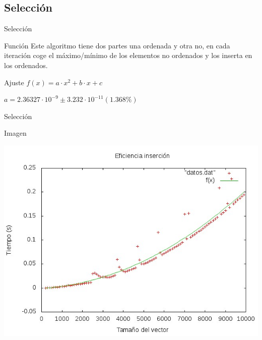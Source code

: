 \documentclass[compress]{beamer}
\begin{document}
\subsection{Selección}
\begin{frame}{Selección}
	\begin{block}{Función}
		Este algoritmo tiene dos partes una ordenada y otra no, en cada iteración coge el 			máximo/mínimo de los elementos no ordenados y los inserta en los ordenados.
	\end{block}
	
	\begin{block}{Ajuste}
	$f(x) = a\cdot x^2 + b\cdot x + c$
	
	$ a               = 2.36327\cdot 10^{-9}      \pm 3.232\cdot 10^{-11}    (1.368\%) $
	\end{block}
\end{frame}

\begin{frame}{Selección}
	\begin{alertblock}{Imagen}
	\begin{center}
	\includegraphics[scale=0.55]{../Graficas/Seleccion/seleccionO0_ruben.jpeg}					\end{center}
	\end{alertblock}
\end{frame}



\end{document}
